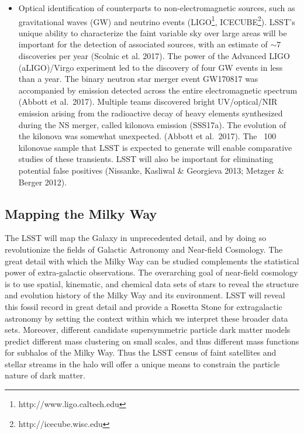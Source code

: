 \begin{itemize}
\item Optical identification of counterparts to non-electromagnetic
  sources, such as gravitational waves (GW) and neutrino events
  (LIGO\footnote{http://www.ligo.caltech.edu},
  ICECUBE\footnote{http://icecube.wisc.edu}).  LSST’s unique ability
  to characterize the faint variable sky over large areas will be
  important for the detection of associated sources, with an estimate
  of $\sim 7$ discoveries per year (Scolnic et al. 2017).  The power
  of the Advanced LIGO (aLIGO)/Virgo experiment led to the discovery
  of four GW events in less than a year. The binary
  neutron star merger event GW170817 was accompanied by emission
  detected across the entire electromagnetic spectrum (Abbott et
  al.~2017). Multiple teams discovered bright UV/optical/NIR emission
  arising from the radioactive decay of heavy elements synthesized
  during the NS merger, called kilonova emission (SSS17a).  The
  evolution of the kilonova was somewhat unexpected.  (Abbott et
  al.~2017).  The ~100 kilonovae sample that LSST is expected to
  generate will enable comparative studies of these transients. LSST
  will also be important for eliminating potential false positives
  (Nissanke, Kasliwal \& Georgieva 2013; Metzger \& Berger 2012).

\end{itemize}


\subsection{Mapping the Milky Way }

The LSST will map the Galaxy in unprecedented detail, and by doing so revolutionize the fields of Galactic
Astronomy and Near-field Cosmology. The great detail with which the Milky Way can be studied complements
the statistical power of extra-galactic observations.  The overarching goal of near-field cosmology is to use
spatial, kinematic, and chemical data sets of stars to reveal the structure and evolution history of the Milky Way
and its environment. LSST will reveal this fossil record in great detail and provide a Rosetta Stone for extragalactic
astronomy by setting the context within which we interpret these
broader data sets. Moreover, different candidate supersymmetric
particle dark matter models predict different mass clustering on small
scales, and thus different mass functions for subhalos of the Milky
Way.  Thus the LSST census of faint satellites and stellar streams in
the halo will offer a unique means to constrain the
particle nature of dark matter.


